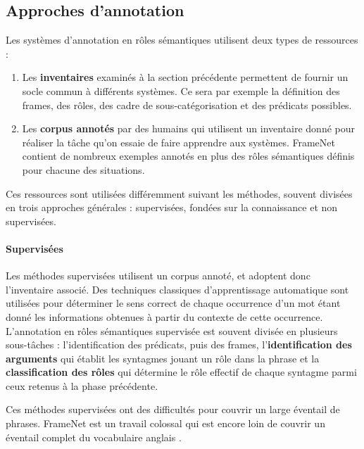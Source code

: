 
\subsection{Approches d'annotation}

Les systèmes d'annotation en rôles sémantiques utilisent deux types de
ressources :

\begin{enumerate}
    \item Les \textbf{inventaires} examinés à la section précédente permettent
        de fournir un socle commun à différents systèmes. Ce sera par exemple
        la définition des frames, des rôles, des cadre de sous-catégorisation
        et des prédicats possibles.
    \item Les \textbf{corpus annotés} par des humains qui utilisent un
        inventaire donné pour réaliser la tâche qu'on essaie de faire apprendre
        aux systèmes. FrameNet contient de nombreux exemples annotés en plus
        des rôles sémantiques définis pour chacune des situations.
\end{enumerate}

Ces ressources sont utilisées différemment suivant les méthodes, souvent
divisées en trois approches générales : supervisées, fondées sur la
connaissance et non supervisées.

\paragraph{Supervisées}

Les méthodes supervisées
\citep{gildea2002automatic,surdeanu2008conll,das2014frame} utilisent un
corpus annoté, et adoptent donc l'inventaire associé. Des techniques classiques
d'apprentissage automatique sont utilisées pour déterminer le sens correct de
chaque occurrence d'un mot étant donné les informations obtenues à partir du
contexte de cette occurrence.  L'annotation en rôles sémantiques supervisée est
souvent divisée en plusieurs sous-tâches : l'identification des prédicats, puis
des frames, l'\textbf{identification des arguments} qui établit les syntagmes
jouant un rôle dans la phrase et la \textbf{classification des rôles} qui
détermine le rôle effectif de chaque syntagme parmi ceux retenus à la phase
précédente.

Ces méthodes supervisées ont des difficultés pour couvrir un large éventail de
phrases. FrameNet est un travail colossal qui est encore loin de couvrir un
éventail complet du vocabulaire anglais \citep[p.~155]{marquez2008semantic}.

